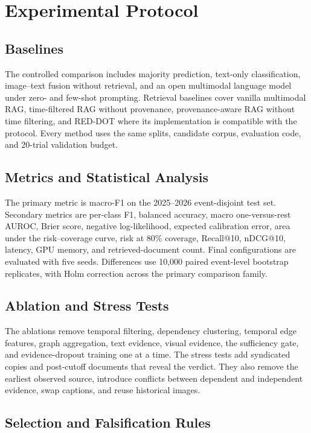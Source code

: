 \section{Experimental Protocol}

\subsection{Baselines}

The controlled comparison includes majority prediction, text-only classification, image--text fusion without retrieval, and an open multimodal language model under zero- and few-shot prompting. Retrieval baselines cover vanilla multimodal RAG, time-filtered RAG without provenance, provenance-aware RAG without time filtering, and RED-DOT where its implementation is compatible with the protocol. Every method uses the same splits, candidate corpus, evaluation code, and 20-trial validation budget.

\subsection{Metrics and Statistical Analysis}

The primary metric is macro-F1 on the 2025--2026 event-disjoint test set. Secondary metrics are per-class F1, balanced accuracy, macro one-versus-rest AUROC, Brier score, negative log-likelihood, expected calibration error, area under the risk--coverage curve, risk at 80\% coverage, Recall@10, nDCG@10, latency, GPU memory, and retrieved-document count. Final configurations are evaluated with five seeds. Differences use 10,000 paired event-level bootstrap replicates, with Holm correction across the primary comparison family.

\subsection{Ablation and Stress Tests}

The ablations remove temporal filtering, dependency clustering, temporal edge features, graph aggregation, text evidence, visual evidence, the sufficiency gate, and evidence-dropout training one at a time. The stress tests add syndicated copies and post-cutoff documents that reveal the verdict. They also remove the earliest observed source, introduce conflicts between dependent and independent evidence, swap captions, and reuse historical images.

\subsection{Selection and Falsification Rules}

